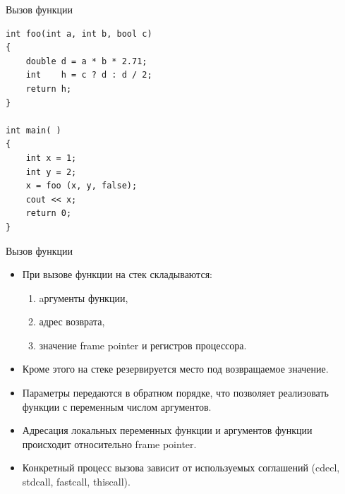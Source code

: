 \documentclass[aspectration=1610,t]{beamer}
\begin{document}
\begin{frame}[fragile]{Вызов функции}
\begin{minipage}{.3\textwidth}
    \end{minipage}\hfill
    \begin{minipage}{.6\textwidth}
        \begin{lstlisting}
int foo(int a, int b, bool c) 
{
    double d = a * b * 2.71;
    int    h = c ? d : d / 2;
    return h;
}

int main( ) 
{
    int x = 1;
    int y = 2;
    x = foo (x, y, false);
    cout << x;
    return 0;
}
        \end{lstlisting}
    \end{minipage}
\end{frame}

\begin{frame}[fragile]{Вызов функции}
    \begin{itemize}
        \item При вызове функции на стек складываются:
            \begin{enumerate}
                \item aргументы функции,
                \item адрес возврата,
                \item значение frame pointer и регистров процессора.
            \end{enumerate}
        \item Кроме этого на стеке резервируется место под
            возвращаемое значение.
        \item Параметры передаются в обратном порядке, что позволяет
            реализовать функции с переменным числом аргументов.
        \item Адресация локальных переменных функции и аргументов
            функции происходит относительно frame pointer.
        \item Конкретный процесс вызова зависит от используемых 
            соглашений (cdecl,  stdcall, fastcall, thiscall).
    \end{itemize}
\end{frame}
\end{document}
